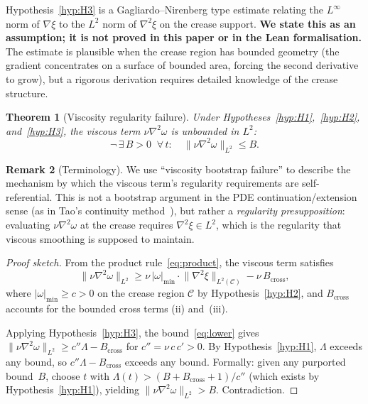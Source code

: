 \documentclass[11pt,a4paper]{article}
\newtheorem{theorem}{Theorem}[section]
\theoremstyle{definition}
\newtheorem{remark}[theorem]{Remark}
\newcommand{\grad}{\nabla}
\newcommand{\lapl}{\nabla^2}
\newcommand{\norm}[1]{\lVert #1 \rVert}
\newcommand{\abs}[1]{\lvert #1 \rvert}
\begin{document}
Hypothesis~\ref{hyp:H3} is a Gagliardo--Nirenberg type estimate
relating the $L^\infty$ norm of $\grad\xi$ to the $L^2$ norm of
$\lapl\xi$ on the crease support.  \textbf{We state this as an
assumption; it is not proved in this paper or in the Lean
formalisation.}  The estimate is plausible when the crease region has
bounded geometry (the gradient concentrates on a surface of bounded
area, forcing the second derivative to grow), but a rigorous
derivation requires detailed knowledge of the crease structure.

\begin{theorem}[Viscosity regularity failure]\label{thm:main}
Under Hypotheses~\ref{hyp:H1},~\ref{hyp:H2}, and~\ref{hyp:H3},
the viscous term $\nu\lapl\omega$ is unbounded in $L^2$:
\[
  \neg\,\exists\, B>0 \;\;\forall\, t:\quad
  \norm{\nu\lapl\omega}_{L^2} \leq B.
\]
\end{theorem}

\begin{remark}[Terminology]
We use ``viscosity bootstrap failure'' to describe the mechanism
by which the viscous term's regularity requirements are
self-referential.  This is not a bootstrap argument in the
PDE continuation/extension sense (as in Tao's continuity
method~\cite{Tao2016}), but rather a \emph{regularity
presupposition}: evaluating $\nu\lapl\omega$ at the crease requires
$\lapl\xi\in L^2$, which is the regularity that viscous smoothing
is supposed to maintain.
\end{remark}

\begin{proof}[Proof sketch]
From the product rule~\eqref{eq:product}, the viscous term satisfies
\begin{equation}\label{eq:lower}
  \norm{\nu\lapl\omega}_{L^2}
    \geq \nu\,\abs{\omega}_{\min}\cdot\norm{\lapl\xi}_{L^2(\mathcal{C})}
    - \nu\,B_{\mathrm{cross}},
\end{equation}
where $\abs{\omega}_{\min} \geq c > 0$ on the crease region
$\mathcal{C}$ by Hypothesis~\ref{hyp:H2}, and
$B_{\mathrm{cross}}$ accounts for the bounded cross terms
(ii) and~(iii).

Applying Hypothesis~\ref{hyp:H3}, the bound~\eqref{eq:lower} gives
$\norm{\nu\lapl\omega}_{L^2} \geq c''\Lambda - B_{\mathrm{cross}}$
for $c''=\nu\,c\,c'>0$.
By Hypothesis~\ref{hyp:H1}, $\Lambda$ exceeds any
bound, so $c''\Lambda - B_{\mathrm{cross}}$ exceeds any bound.
Formally: given any purported bound~$B$, choose $t$ with
$\Lambda(t)>(B+B_{\mathrm{cross}}+1)/c''$ (which exists by
Hypothesis~\ref{hyp:H1}), yielding
$\norm{\nu\lapl\omega}_{L^2}>B$.  Contradiction.
\end{proof}
\end{document}
